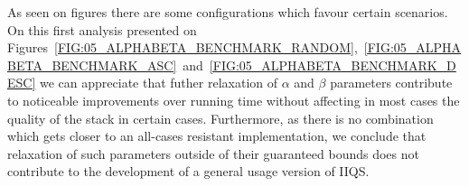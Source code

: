 As seen on figures there are some configurations which favour certain scenarios. On this first analysis presented on Figures~\ref{FIG:05_ALPHABETA_BENCHMARK_RANDOM},~\ref{FIG:05_ALPHABETA_BENCHMARK_ASC}~and~\ref{FIG:05_ALPHABETA_BENCHMARK_DESC} we can appreciate that futher relaxation of $\alpha$ and $\beta$ parameters contribute to noticeable improvements over running time without affecting in most cases the quality of the stack in certain cases. Furthermore, as there is no combination which gets closer to an all-cases resistant implementation, we conclude that relaxation of such parameters outside of their guaranteed bounds does not contribute to the development of a general usage version of IIQS.\\





